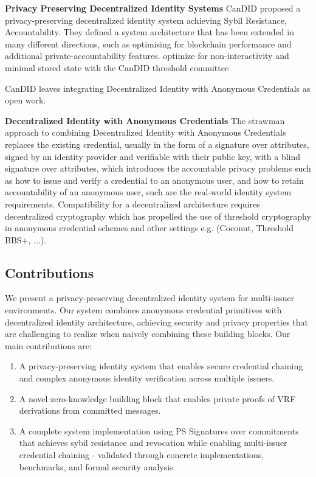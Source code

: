 \noindent \textbf{Privacy Preserving Decentralized Identity Systems}
CanDID proposed a privacy-preserving decentralized identity system achieving Sybil Resistance, Accountability. 
They defined a system architecture that has been extended in many different directions, such as \cite{wang2023hades, rathee_zebra_2022} optimising for blockchain performance and additional private-accountability features. \cite{crites_syra_2024, rabaninejad_attribute-based_nodate} optimize for non-interactivity and minimal stored state with the CanDID threshold committee

CanDID leaves integrating Decentralized Identity with Anonymous Credentials as open work.

\noindent \textbf{Decentralized Identity with Anonymous Credentials}
The strawman approach to combining Decentralized Identity with Anonymous Credentials replaces the existing credential, usually in the form of a signature over attributes, signed by an identity provider and verifiable with their public key, with a blind signature over attributes, which introduces the accountable privacy problems such as how to issue and verify a credential to an anonymous user, and how to retain accountability of an anonymous user, such are the real-world identity system requirements. 
Compatibility for a decentralized architecture requires decentralized cryptography which has propelled the use of threshold cryptography in anonymous credential schemes and other settings e.g. (Coconut, Threshold BBS+, ...). 


\newpage

\subsection{Contributions}

We present a privacy-preserving decentralized identity system for multi-issuer environments. Our system combines anonymous credential primitives with decentralized identity architecture, achieving security and privacy properties that are challenging to realize when naively combining these building blocks. Our main contributions are:

\begin{enumerate}
    
    \item  A privacy-preserving identity system that enables secure credential chaining and complex anonymous identity verification across multiple issuers.

    \item A novel zero-knowledge building block that enables private proofs of VRF derivations from committed messages.
    
    \item  A complete system implementation using PS Signatures over commitments that achieves sybil resistance and revocation while enabling multi-issuer credential chaining - validated through concrete implementations, benchmarks, and formal security analysis.

\end{enumerate}

